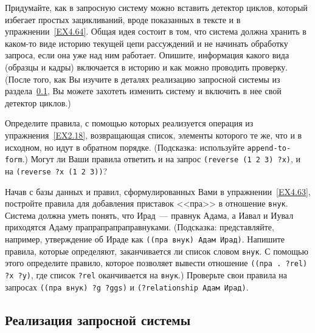 \begin{exercise}{4.67}%
\label{EX4.67}%
%
Придумайте, как в запросную систему можно вставить 
детектор циклов, который избегает простых  зацикливаний, вроде
показанных в тексте и в упражнении~\ref{EX4.64}.  Общая
идея состоит в том, что система должна хранить в каком-то виде историю
текущей цепи рассуждений и не начинать обработку запроса, если она уже
над ним работает.  Опишите, информация какого вида (образцы и кадры)
включается в историю и как можно проводить проверку. (После того, как
Вы изучите в деталях реализацию запросной системы из 
раздела~\ref{IMPLEMENTING-THE-QUERY-SYSTEM}, Вы можете захотеть
изменить систему и включить в нее свой детектор циклов.)
\end{exercise}

\begin{exercise}{4.68}%
\label{EX4.68}%
Определите правила, с помощью которых реализуется
операция   из 
упражнения~\ref{EX2.18}, возвращающая список, элементы которого те же, что 
и в исходном, но идут в обратном порядке.  (Подсказка: используйте
{\tt append-to-form}.)  Могут ли Ваши правила ответить и на
запрос {\tt (reverse (1 2 3) ?x)}, и на {\tt (reverse ?x (1 2
3))}?
\end{exercise}

\begin{exercise}{4.69}%
\label{EX4.69}%
Начав с базы данных и правил, сформулированных Вами в
упражнении~\ref{EX4.63}, постройте правила для добавления
приставок <<пра>> в отношение {\tt внук}.  Система должна уметь
понять, что Ирад~--- правнук Адама, а Иавал и Иувал приходятся Адаму
прапрапрапраправнуками. (Подсказка: представляйте, например,
утверждение об Ираде как {\tt ((пра внук) Адам Ирад)}.
Напишите правила, которые определяют, заканчивается ли список словом
{\tt внук}.  С помощью этого определите правило, которое
позволяет вывести отношение {\tt ((пра . ?rel) ?x ?y)}, где
список {\tt ?rel} оканчивается на {\tt внук}.)
Проверьте свои правила на запросах {\tt ((пра внук) ?g ?ggs)} и
{\tt (?relationship Адам Ирад)}.
\end{exercise}

\subsection{Реализация запросной системы}
\label{IMPLEMENTING-THE-QUERY-SYSTEM}%


